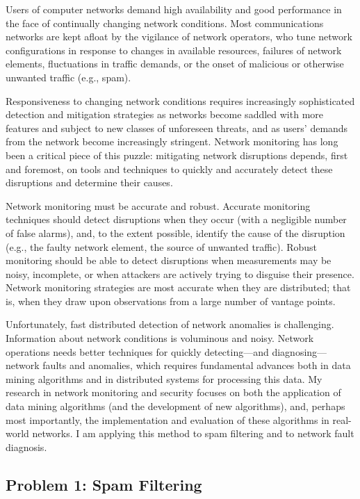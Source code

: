 Users of computer networks demand high availability and good performance
in the face of continually changing network conditions.  Most
communications networks are kept afloat by the vigilance of network
operators, who tune network configurations in response to changes in
available resources, failures of network elements, fluctuations in
traffic demands, or the onset of malicious or otherwise unwanted traffic
(e.g., spam).

Responsiveness to changing network conditions requires increasingly
sophisticated detection and mitigation strategies as networks become
saddled with more features and subject to new classes of unforeseen
threats, and as users' demands from the network become increasingly
stringent.  Network monitoring has long been a critical piece of this
puzzle: mitigating network disruptions depends, first and foremost, on
tools and techniques to quickly and accurately detect these disruptions
and determine their causes.

Network monitoring must be accurate and robust.  Accurate monitoring
techniques should detect disruptions when they occur (with a negligible
number of false alarms), and, to the extent possible, identify the cause
of the disruption (e.g., the faulty network element, the source of
unwanted traffic).  Robust monitoring should be able to detect
disruptions when measurements may be noisy, incomplete, or when
attackers are actively trying to disguise their presence.  Network
monitoring strategies are most accurate when they are distributed; that
is, when they draw upon observations from a large number of vantage
points.

Unfortunately, fast distributed detection of network anomalies is
challenging. Information about network conditions is voluminous and
noisy.  Network operations needs better techniques for quickly
detecting---and diagnosing---network faults and anomalies, which
requires fundamental advances both in data mining algorithms and in
distributed systems for processing this data.  My research in network
monitoring and security focuses on both the application of data mining
algorithms (and the development of new algorithms), and, perhaps most
importantly, the implementation and evaluation of these algorithms in
real-world networks.  I am applying this method to spam filtering and to
network fault diagnosis.

\subsection*{Problem 1: Spam Filtering}

